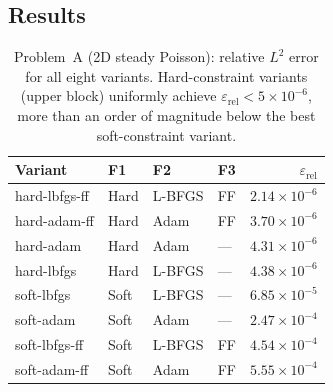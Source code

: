 \documentclass{article}
\newcommand{\relL}{\varepsilon_{\mathrm{rel}}}
\begin{document}
\subsection{Results}

\begin{table}[h]
\centering
\caption{Problem~A (2D steady Poisson): relative $L^2$ error for all eight variants.
Hard-constraint variants (upper block) uniformly achieve $\relL < 5\times10^{-6}$,
more than an order of magnitude below the best soft-constraint variant.}
\label{tab:heat_A}
\small
\begin{tabular}{llllr}
\toprule
Variant & F1 & F2 & F3 & $\relL$ \\
\midrule
hard-lbfgs-ff & Hard & L-BFGS & FF   & $2.14\times10^{-6}$ \\
hard-adam-ff  & Hard & Adam   & FF   & $3.70\times10^{-6}$ \\
hard-adam     & Hard & Adam   & ---  & $4.31\times10^{-6}$ \\
hard-lbfgs    & Hard & L-BFGS & ---  & $4.38\times10^{-6}$ \\
\midrule
soft-lbfgs    & Soft & L-BFGS & ---  & $6.85\times10^{-5}$ \\
soft-adam     & Soft & Adam   & ---  & $2.47\times10^{-4}$ \\
soft-lbfgs-ff & Soft & L-BFGS & FF   & $4.54\times10^{-4}$ \\
soft-adam-ff  & Soft & Adam   & FF   & $5.55\times10^{-4}$ \\
\bottomrule
\end{tabular}
\end{table}
\end{document}

